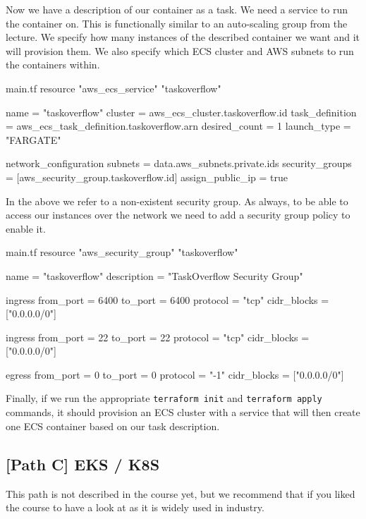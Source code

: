 \documentclass{csse4400}
\begin{document}
Now we have a description of our container as a task.
We need a service to run the container on.
This is functionally similar to an auto-scaling group from the lecture.
We specify how many instances of the described container we want and it will provision them.
We also specify which ECS cluster and AWS subnets to run the containers within.

\begin{code}[language=terraform,numbers=none]{main.tf}
resource "aws_ecs_service" "taskoverflow" {
    name            = "taskoverflow"
    cluster         = aws_ecs_cluster.taskoverflow.id
    task_definition = aws_ecs_task_definition.taskoverflow.arn
    desired_count   = 1
    launch_type     = "FARGATE"
  
    network_configuration {
      subnets             = data.aws_subnets.private.ids
      security_groups     = [aws_security_group.taskoverflow.id]
      assign_public_ip    = true
    }
}
\end{code}

In the above we refer to a non-existent security group.
As always, to be able to access our instances over the network we need to add a security group policy to enable it.

\begin{code}[language=terraform,numbers=none]{main.tf}
resource "aws_security_group" "taskoverflow" {
    name = "taskoverflow"
    description = "TaskOverflow Security Group"
  
    ingress {
      from_port = 6400
      to_port = 6400
      protocol = "tcp"
      cidr_blocks = ["0.0.0.0/0"]
    }
  
    ingress {
      from_port = 22
      to_port = 22
      protocol = "tcp"
      cidr_blocks = ["0.0.0.0/0"]
    }
  
    egress {
      from_port = 0
      to_port = 0
      protocol = "-1"
      cidr_blocks = ["0.0.0.0/0"]
    }
}
\end{code}

Finally, if we run the appropriate \texttt{terraform init} and \texttt{terraform apply} commands,
it should provision an ECS cluster with a service that will then create one ECS container based on our task description.

\subsection{[Path C] EKS / K8S}

This path is not described in the course yet,
but we recommend that if you liked the course to have a look at  as it is widely used in industry.



\end{document}
